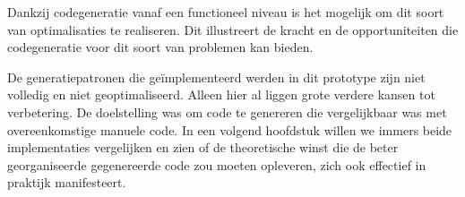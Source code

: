 Dankzij codegeneratie vanaf een functioneel niveau is het mogelijk om dit soort
van optimalisaties te realiseren. Dit illustreert de kracht en de
opportuniteiten die codegeneratie voor dit soort van problemen kan bieden.

De generatiepatronen die ge\"implementeerd werden in dit prototype zijn niet
volledig en niet geoptimaliseerd. Alleen hier al liggen grote verdere kansen
tot verbetering. De doelstelling was om code te genereren die vergelijkbaar was
met overeenkomstige manuele code. In een volgend hoofdstuk willen we immers
beide implementaties vergelijken en zien of de theoretische winst die de beter
georganiseerde gegenereerde code zou moeten opleveren, zich ook effectief in
praktijk manifesteert.
